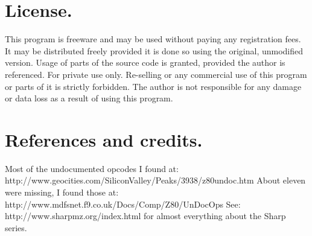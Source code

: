 \documentclass{article}
\begin{document}
\section{License.}
This program is freeware and may be used without paying any registration fees.
It may be distributed freely provided it is done so using the original, 
unmodified version. Usage of parts of the source code is granted, provided the 
author is referenced. For private use only. Re-selling or any commercial use of
this program or parts of it is strictly forbidden. The author is not 
responsible for any damage or data loss as a result of using this program.

\section{References and credits.}
Most of the undocumented opcodes I found at: \\
http://www.geocities.com/SiliconValley/Peaks/3938/z80undoc.htm About eleven 
were missing, I found those at: \\
http://www.mdfsnet.f9.co.uk/Docs/Comp/Z80/UnDocOps See: \\
http://www.sharpmz.org/index.html for almost everything about the Sharp series.
\end{document}
